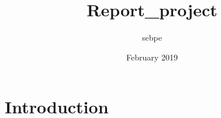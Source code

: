 \documentclass{article}
\title{Report_project}
\author{sebpe }
\date{February 2019}
\begin{document}
\maketitle

\section{Introduction}
\end{document}
